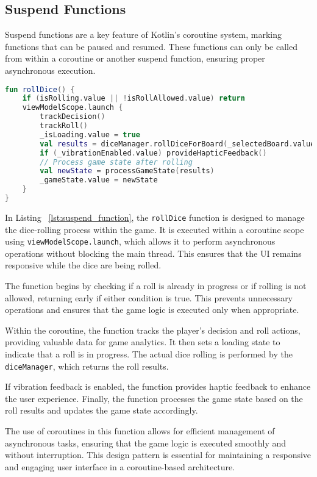 \subsection{Suspend Functions}

Suspend functions are a key feature of Kotlin's coroutine system, marking functions that can be paused and resumed. These functions can only be called from within a coroutine or another suspend function, ensuring proper asynchronous execution.
\begin{lstlisting}[language=Kotlin, caption={Suspend Function Example}, label=lst:suspend_function]
fun rollDice() {
    if (isRolling.value || !isRollAllowed.value) return
    viewModelScope.launch {
        trackDecision()
        trackRoll()
        _isLoading.value = true
        val results = diceManager.rollDiceForBoard(_selectedBoard.value)
        if (_vibrationEnabled.value) provideHapticFeedback()
        // Process game state after rolling
        val newState = processGameState(results)
        _gameState.value = newState
    }
}
\end{lstlisting}

In Listing ~\ref{lst:suspend_function}, the \texttt{rollDice} function is designed to manage the dice-rolling process within the game. It is executed within a coroutine scope using \texttt{viewModelScope.launch}, which allows it to perform asynchronous operations without blocking the main thread. This ensures that the UI remains responsive while the dice are being rolled.

The function begins by checking if a roll is already in progress or if rolling is not allowed, returning early if either condition is true. This prevents unnecessary operations and ensures that the game logic is executed only when appropriate.

Within the coroutine, the function tracks the player's decision and roll actions, providing valuable data for game analytics. It then sets a loading state to indicate that a roll is in progress. The actual dice rolling is performed by the \texttt{diceManager}, which returns the roll results.

If vibration feedback is enabled, the function provides haptic feedback to enhance the user experience. Finally, the function processes the game state based on the roll results and updates the game state accordingly.

The use of coroutines in this function allows for efficient management of asynchronous tasks, ensuring that the game logic is executed smoothly and without interruption. This design pattern is essential for maintaining a responsive and engaging user interface in a coroutine-based architecture.

